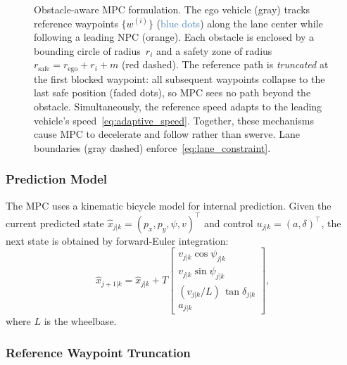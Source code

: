 \documentclass[conference]{IEEEtran}
\begin{document}
\begin{figure}[t]
{}
  \caption{Obstacle-aware MPC formulation.  The ego vehicle
    (gray) tracks reference waypoints
    $\{w^{(i)}\}$ (\textcolor{steelblue}{blue dots})
    along the lane center while following a leading NPC
    (\textcolor{amber}{orange}).  Each obstacle is enclosed by
    a bounding circle of radius~$r_i$ and a safety zone of
    radius~$r_{\mathrm{safe}} = r_{\mathrm{ego}} + r_i + m$
    (\textcolor{mutedred}{red dashed}).  The reference path is
    \emph{truncated} at the first blocked waypoint: all
    subsequent waypoints collapse to the last safe position
    (faded dots), so MPC sees no path beyond the obstacle.
    Simultaneously, the reference speed adapts to the leading
    vehicle's speed~\eqref{eq:adaptive_speed}.  Together, these
    mechanisms cause MPC to decelerate and follow rather than
    swerve.  Lane boundaries (gray dashed) enforce~\eqref{eq:lane_constraint}.}
  \label{fig:mpc_obstacle}
\end{figure}

\subsubsection{Prediction Model}\label{sec:bicycle}

The MPC uses a kinematic bicycle model for internal prediction.
Given the current predicted state
$\hat{x}_{j|k} = (p_x, p_y, \psi, v)^\top$ and control
$u_{j|k} = (a, \delta)^\top$, the next state is obtained by
forward-Euler integration:
\begin{equation}\label{eq:bicycle}
  \hat{x}_{j+1|k} = \hat{x}_{j|k}
  + T\!
  \begin{bmatrix}
    v_{j|k}\cos\psi_{j|k} \\[2pt]
    v_{j|k}\sin\psi_{j|k} \\[2pt]
    (v_{j|k}/L)\,\tan\delta_{j|k} \\[2pt]
    a_{j|k}
  \end{bmatrix},
\end{equation}
where $L$ is the wheelbase.

\subsubsection{Reference Waypoint Truncation}
\label{sec:wp_filter}
\end{document}
